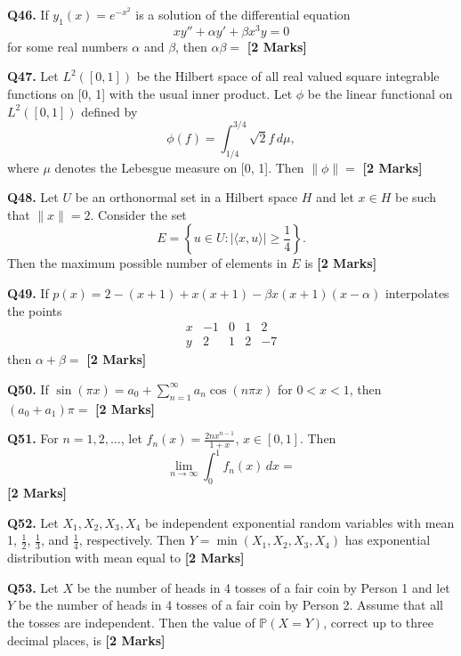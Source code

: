 \documentclass[11pt]{article}
\newcommand{\questionb}[2]{
    \noindent\textbf{Q#2.} #1 \hfill \textbf{[2 Marks]}
}
\begin{document}
\questionb{If \( y_1(x) = e^{-x^2} \) is a solution of the differential equation
\[
x y'' + \alpha y' + \beta x^3 y = 0
\]
for some real numbers \( \alpha \) and \( \beta \), then \( \alpha\beta = \)}{46}
\vspace{0.5cm}

\questionb{Let \( L^2([0, 1]) \) be the Hilbert space of all real valued square integrable functions on [0, 1] with the usual inner product. Let \( \phi \) be the linear functional on \( L^2([0, 1]) \) defined by
\[
\phi(f) = \int_{1/4}^{3/4} \sqrt{2} f \, d\mu,
\]
where \( \mu \) denotes the Lebesgue measure on [0, 1]. Then \( \|\phi\| = \)}{47}
\vspace{0.5cm}

\questionb{Let \( U \) be an orthonormal set in a Hilbert space \( H \) and let \( x \in H \) be such that \( \|x\| = 2 \). Consider the set
\[
E = \left\{ u \in U : |\langle x, u \rangle| \geq \frac{1}{4} \right\}.
\]
Then the maximum possible number of elements in \( E \) is}{48}
\vspace{0.5cm}

\questionb{If \( p(x) = 2 - (x + 1) + x(x + 1) - \beta x(x + 1)(x - \alpha) \) interpolates the points \[
\begin{array}{c|cccc}
x & -1 & 0 & 1 & 2 \\
\hline
y & 2 & 1 & 2 & -7
\end{array}
\]
then \( \alpha + \beta = \)}{49}
\vspace{0.5cm}

\questionb{If \( \sin(\pi x) = a_0 + \sum_{n=1}^{\infty} a_n \cos(n \pi x) \) for \( 0 < x < 1 \), then \( (a_0 + a_1)\pi = \)}{50}
\vspace{0.5cm}

\questionb{For \( n = 1, 2, \ldots \), let \( f_n(x) = \frac{2n x^{n-1}}{1 + x} \), \( x \in [0, 1] \). Then
\[
\lim_{n \to \infty} \int_0^1 f_n(x)\, dx = 
\]}{51}
\vspace{0.5cm}

\questionb{Let \( X_1, X_2, X_3, X_4 \) be independent exponential random variables with mean 1, \( \frac{1}{2} \), \( \frac{1}{3} \), and \( \frac{1}{4} \), respectively. Then \( Y = \min(X_1, X_2, X_3, X_4) \) has exponential distribution with mean equal to}{52}
\vspace{0.5cm}

\questionb{Let \( X \) be the number of heads in 4 tosses of a fair coin by Person 1 and let \( Y \) be the number of heads in 4 tosses of a fair coin by Person 2. Assume that all the tosses are independent. Then the value of \( \mathbb{P}(X = Y) \), correct up to three decimal places, is}{53}
\vspace{0.5cm}
\end{document}
